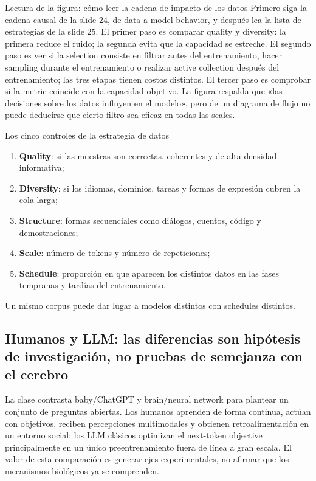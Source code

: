 
\begin{knowledgebox}{Lectura de la figura: cómo leer la cadena de impacto de los datos}
Primero siga la cadena causal de la slide 24, de data a model behavior, y después lea la lista de estrategias de la slide 25. El primer paso es comparar quality y diversity: la primera reduce el ruido; la segunda evita que la capacidad se estreche. El segundo paso es ver si la selection consiste en filtrar antes del entrenamiento, hacer sampling durante el entrenamiento o realizar active collection después del entrenamiento; las tres etapas tienen costos distintos. El tercer paso es comprobar si la metric coincide con la capacidad objetivo. La figura respalda que «las decisiones sobre los datos influyen en el modelo», pero de un diagrama de flujo no puede deducirse que cierto filtro sea eficaz en todas las scales.
\end{knowledgebox}

\begin{importantbox}{Los cinco controles de la estrategia de datos}
\begin{enumerate}
  \item \textbf{Quality}: si las muestras son correctas, coherentes y de alta densidad informativa;
  \item \textbf{Diversity}: si los idiomas, dominios, tareas y formas de expresión cubren la cola larga;
  \item \textbf{Structure}: formas secuenciales como diálogos, cuentos, código y demostraciones;
  \item \textbf{Scale}: número de tokens y número de repeticiones;
  \item \textbf{Schedule}: proporción en que aparecen los distintos datos en las fases tempranas y tardías del entrenamiento.
\end{enumerate}
Un mismo corpus puede dar lugar a modelos distintos con schedules distintos.
\end{importantbox}

\subsection{Humanos y LLM: las diferencias son hipótesis de investigación, no pruebas de semejanza con el cerebro}

La clase contrasta baby/ChatGPT y brain/neural network para plantear un conjunto de preguntas abiertas. Los humanos aprenden de forma continua, actúan con objetivos, reciben percepciones multimodales y obtienen retroalimentación en un entorno social; los LLM clásicos optimizan el next-token objective principalmente en un único preentrenamiento fuera de línea a gran escala. El valor de esta comparación es generar ejes experimentales, no afirmar que los mecanismos biológicos ya se comprenden.


